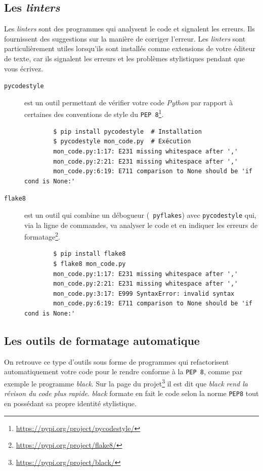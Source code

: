 \documentclass[a4paper,12pt]{book}
\begin{document}
\subsection*{Les \textit{linters}}
Les \textit{linters} sont des programmes qui analysent le code et signalent les erreurs. Ils fournissent des suggestions sur la manière de corriger l'erreur. Les \textit{linters} sont particulièrement utiles lorsqu'ils sont installés comme extensions de votre éditeur de texte, car ils signalent les erreurs et les problèmes stylistiques pendant que vous écrivez.
\medskip

\begin{description}
	\item[\texttt{pycodestyle}] est un outil permettant de vérifier votre code \textit{Python} par rapport à certaines des conventions de style du \texttt{PEP 8}\footnote{\url{https://pypi.org/project/pycodestyle/}}.
	\begin{verbatim}
	    $ pip install pycodestyle  # Installation
	    $ pycodestyle mon_code.py  # Exécution
	    mon_code.py:1:17: E231 missing whitespace after ','
	    mon_code.py:2:21: E231 missing whitespace after ','
	    mon_code.py:6:19: E711 comparison to None should be 'if cond is None:'
	\end{verbatim}
	\item[\texttt{flake8}] est un outil qui combine un débogueur (\texttt{ pyflakes}) avec \texttt{pycodestyle} qui, via la ligne de commandes, va analyser le code et en indiquer les erreurs de formatage\footnote{\url{https://pypi.org/project/flake8/}}.
	\begin{verbatim}
	    $ pip install flake8
	    $ flake8 mon_code.py
	    mon_code.py:1:17: E231 missing whitespace after ','
	    mon_code.py:2:21: E231 missing whitespace after ','
	    mon_code.py:3:17: E999 SyntaxError: invalid syntax
	    mon_code.py:6:19: E711 comparison to None should be 'if cond is None:'
	\end{verbatim}
\end{description}
\medskip

\subsection*{Les outils de formatage automatique}
On retrouve ce type d'outils sous forme de programmes qui refactorisent automatiquement votre code pour le rendre conforme à la \texttt{PEP 8}, comme par exemple le programme \textit{black}. Sur la page du projet\footnote{\url{https://pypi.org/project/black/}} il est dit que \textit{black} \og \textit{rend la révison du code plus rapide}\fg{}. \textit{black} formate en fait le code selon la norme \texttt{PEP8} tout en possédant sa propre identité stylistique.
\medskip
\end{document}
